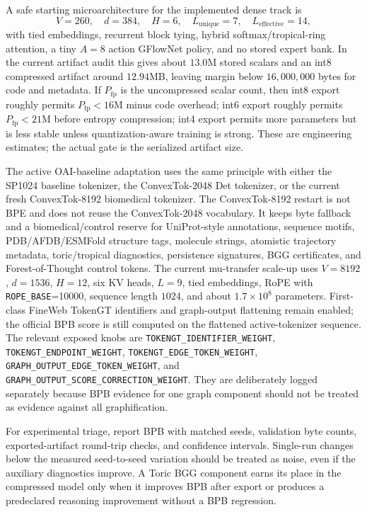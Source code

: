 \documentclass[11pt]{article}
\theoremstyle{definition}
\theoremstyle{plain}
\theoremstyle{remark}
\numberwithin{equation}{section}
\begin{document}
A safe starting microarchitecture for the implemented dense track is
\begin{equation}
  V=260,\quad d=384,\quad H=6,\quad
  L_{\mathrm{unique}}=7,\quad L_{\mathrm{effective}}=14,
\end{equation}
with tied embeddings, recurrent block tying, hybrid softmax/tropical-ring attention, a tiny $A=8$ action GFlowNet policy, and no stored expert bank.  In the current artifact audit this gives about $13.0$M stored scalars and an int8 compressed artifact around $12.94$MB, leaving margin below $16{,}000{,}000$ bytes for code and metadata.  If $P_{\mathrm{fp}}$ is the uncompressed scalar count, then int8 export roughly permits $P_{\mathrm{fp}}<16$M minus code overhead; int6 export roughly permits $P_{\mathrm{fp}}<21$M before entropy compression; int4 export permits more parameters but is less stable unless quantization-aware training is strong.  These are engineering estimates; the actual gate is the serialized artifact size.

The active OAI-baseline adaptation uses the same principle with either the
SP1024 baseline tokenizer, the ConvexTok-2048 Det tokenizer, or the current
fresh ConvexTok-8192 biomedical tokenizer.  The ConvexTok-8192 restart is not
BPE and does not reuse the ConvexTok-2048 vocabulary.  It keeps byte fallback
and a biomedical/control reserve for UniProt-style annotations, sequence
motifs, PDB/AFDB/ESMFold structure tags, molecule strings, atomistic trajectory
metadata, toric/tropical diagnostics, persistence signatures, BGG certificates,
and Forest-of-Thought control tokens.  The current mu-transfer scale-up uses
$V=8192$, $d=1536$, $H=12$, six KV heads, $L=9$, tied embeddings, RoPE with
\texttt{ROPE\_BASE}=10000, sequence length $1024$, and about $1.7\times10^8$
parameters.  First-class FineWeb TokenGT identifiers and graph-output
flattening remain enabled; the official BPB score is still computed on the
flattened active-tokenizer sequence.
The relevant exposed knobs are
\texttt{TOKENGT\_IDENTIFIER\_WEIGHT},
\texttt{TOKENGT\_ENDPOINT\_WEIGHT},
\texttt{TOKENGT\_EDGE\_TOKEN\_WEIGHT},
\texttt{GRAPH\_OUTPUT\_EDGE\_TOKEN\_WEIGHT}, and
\texttt{GRAPH\_OUTPUT\_SCORE\_CORRECTION\_WEIGHT}.  They are deliberately
logged separately because BPB evidence for one graph component should not be
treated as evidence against all graphification.

For experimental triage, report BPB with matched seeds, validation byte counts, exported-artifact round-trip checks, and confidence intervals.  Single-run changes below the measured seed-to-seed variation should be treated as noise, even if the auxiliary diagnostics improve.  A Toric BGG component earns its place in the compressed model only when it improves BPB after export or produces a predeclared reasoning improvement without a BPB regression.
\end{document}
